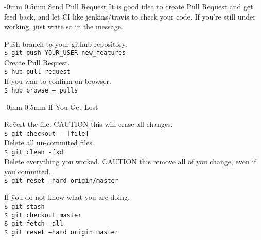 \documentclass[10pt,landscape]{article}
\makeatletter
\renewcommand{\section}{\@startsection{section}{1}{0mm}%
                                {-0mm} %
                                {0.5mm}%
                                {\normalfont\large\bfseries}}
\makeatother
\begin{document}
\begin{multicols}{2}
\section{Send Pull Request}
\vspace{2.5mm}
It is good idea to create Pull Request and get
feed back, and let CI like jenkins/travis to check your code.
If you're still under working, just write so in the message.
\begin{tabbing}
Pu\=sh branch to your github repository.\\
\> \texttt{\$ git push YOUR\_USER new\_features}\\  
Create Pull Request.\\
\> \texttt{\$ hub pull-request}\\  
If you wan to confirm on browser.\\
\> \texttt{\$ hub browse -- pulls}\\  
\end{tabbing}

\section{If You Get Lost}

\vspace{2.5mm}
\begin{tabbing}
Re\=vert the file. CAUTION this will erase all changes.\\
\> \texttt{\$ git checkout -- [file]}\\
Delete all un-commited files.\\
\> \texttt{\$ git clean -fxd}\\
Delete everything you worked. CAUTION this remove all of
you change, even if you commited.\\
\> \texttt{\$ git reset --hard origin/master}\\
\end{tabbing}

\begin{tabbing}
If \=you do not know what you are doing.\\
\> \texttt{\$ git stash}\\
\> \texttt{\$ git checkout master}\\
\> \texttt{\$ git fetch --all}\\
\> \texttt{\$ git reset --hard origin master}\\  
\end{tabbing}


\end{multicols}
\end{document}
